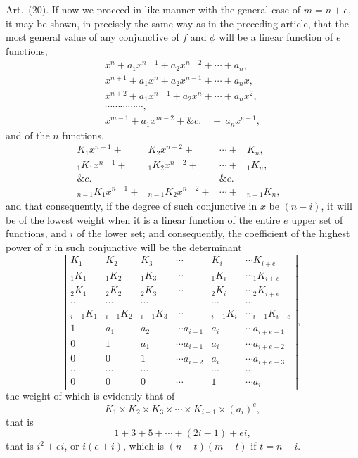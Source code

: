 \documentclass[11pt]{article}
\newcommand{\sourcepage}[1]{\marginpar{\scriptsize p.~#1}}
\newcommand{\art}[1]{\par\smallskip\noindent Art.~(#1).\quad}
\begin{document}
\sourcepage{467}
\art{20} If now we proceed in like manner with the general case of $m=n+e$, it may be shown, in precisely the same way as in the preceding article, that the most general value of any conjunctive of $f$ and $\phi$ will be a linear function of $e$ functions,
\[
\begin{array}{ccccc}
x^n+a_1x^{n-1}+a_2x^{n-2}+\cdots+a_n,\\
x^{n+1}+a_1x^n+a_2x^{n-1}+\cdots+a_nx,\\
x^{n+2}+a_1x^{n+1}+a_2x^n+\cdots+a_nx^2,\\
\cdots\cdots\cdots\cdots\cdots,\\
x^{m-1}+a_1x^{m-2}+\&c.\quad+\ a_nx^{e-1},
\end{array}
\]
and of the $n$ functions,
\[
\begin{array}{ccccc}
K_1x^{n-1}+&K_2x^{n-2}+&\cdots+&K_n,\\
{}_1K_1x^{n-1}+&{}_1K_2x^{n-2}+&\cdots+&{}_1K_n,\\
\&c.&&\&c.&&\\
{}_{n-1}K_1x^{n-1}+&{}_{n-1}K_2x^{n-2}+&\cdots+&{}_{n-1}K_n,
\end{array}
\]
and that consequently, if the degree of such conjunctive in $x$ be $(n-i)$, it will be of the lowest weight when it is a linear function of the entire $e$ upper set of functions, and $i$ of the lower set; and consequently, the coefficient of the highest power of $x$ in such conjunctive will be the determinant
\begingroup\scriptsize
\[
\left|
\begin{array}{cccccc}
K_1&K_2&K_3&\cdots&K_i&\cdots K_{i+e}\\
{}_1K_1&{}_1K_2&{}_1K_3&\cdots&{}_1K_i&\cdots {}_1K_{i+e}\\
{}_2K_1&{}_2K_2&{}_2K_3&\cdots&{}_2K_i&\cdots {}_2K_{i+e}\\
\cdots&\cdots&\cdots&&\cdots&\cdots\\
{}_{i-1}K_1&{}_{i-1}K_2&{}_{i-1}K_3&\cdots&{}_{i-1}K_i&\cdots {}_{i-1}K_{i+e}\\
1&a_1&a_2&\cdots a_{i-1}&a_i&\cdots a_{i+e-1}\\
0&1&a_1&\cdots a_{i-1}&a_i&\cdots a_{i+e-2}\\
0&0&1&\cdots a_{i-2}&a_i&\cdots a_{i+e-3}\\
\cdots&\cdots&\cdots&&\cdots&\cdots\\
0&0&0&\cdots&1&\cdots a_i
\end{array}
\right|,
\]
\endgroup
the weight of which is evidently that of
\[
K_1\times K_2\times K_3\times\cdots\times K_{i-1}\times(a_i)^e,
\]
that is
\[
1+3+5+\cdots+(2i-1)+ei,
\]
that is $i^2+ei$, or $i(e+i)$, which is $(n-t)(m-t)$ if $t=n-i$.
\end{document}
